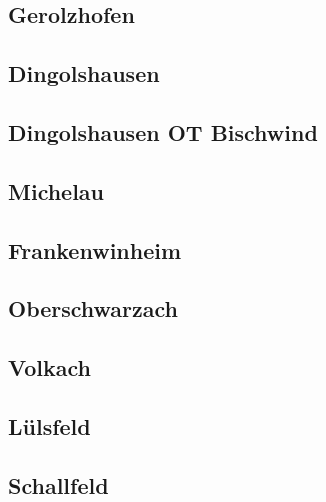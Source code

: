 \documentclass[fontsize=12pt,a4paper]{scrreprt}
\begin{document}
                \subsection{Gerolzhofen}
                
                
                \subsection{Dingolshausen}
                
                
                \subsection{Dingolshausen OT Bischwind}
                
                
                \subsection{Michelau}
                
                
                \subsection{Frankenwinheim}
                
                
                \subsection{Oberschwarzach}
                
                
                \subsection{Volkach}
                
                
                \subsection{Lülsfeld}
                
                
                \subsection{Schallfeld}
                
                
\end{document}
